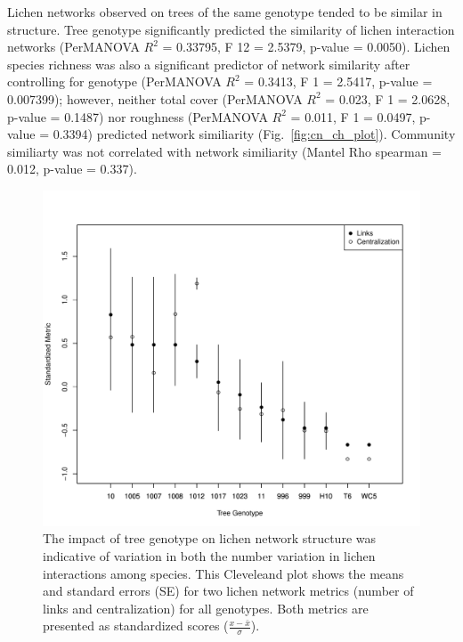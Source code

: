 \documentclass[9pt,twocolumn,twoside,lineno]{pnas-new}
\begin{document}
{Lichen networks observed on trees of the same genotype tended to be
similar in structure. Tree genotype significantly predicted the
similarity of lichen interaction networks (PerMANOVA $R^2$ = 0.33795,
F 12 = 2.5379, p-value = 0.0050). Lichen species richness was also a
significant predictor of network similarity after controlling for
genotype (PerMANOVA $R^2$ = 0.3413, F 1 = 2.5417, p-value = 0.007399);
however, neither total cover (PerMANOVA $R^2$ = 0.023, F 1 = 2.0628,
p-value = 0.1487) nor roughness (PerMANOVA $R^2$ = 0.011, F 1 =
0.0497, p-value = 0.3394) predicted network similiarity
(Fig.~\ref{fig:cn_ch_plot}). Community similiarty was not correlated with
network similiarity (Mantel Rho spearman = 0.012, p-value = 0.337).


\begin{figure}[ht]
\centering
\includegraphics[width=\linewidth]{cn_metrics.pdf}
\caption{The impact of tree genotype on lichen network structure was
  indicative of variation in both the number variation in lichen
  interactions among species. This Cleveleand plot shows the means and
  standard errors (SE) for two lichen network metrics (number of links
  and centralization) for all genotypes. Both metrics are presented as
  standardized scores ($\frac{x - \bar{x}}{\sigma}$).}
\label{fig:cn_metrics}
\end{figure}


}
\end{document}

